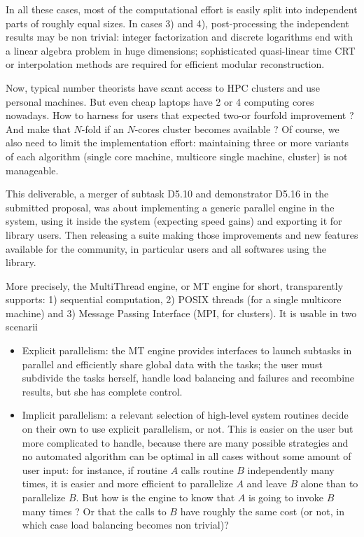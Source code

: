 \documentclass{deliverablereport}
\begin{document}
In all these cases, most of the computational effort is easily split into
independent parts of roughly equal sizes. In cases 3) and 4),
post-processing the independent results may be non trivial: integer
factorization and discrete logarithms end with a linear algebra problem in
huge dimensions; sophisticated quasi-linear time CRT or interpolation methods
are required for efficient modular reconstruction.

Now, typical number theorists have scant access to HPC clusters and use
personal machines. But even cheap laptops have 2 or 4 computing cores
nowadays. How to harness for \PariGP users that expected two-or fourfold
improvement ? And make that $N$-fold if an $N$-cores cluster becomes
available ? Of course, we also need to limit the implementation effort:
maintaining three or more variants of each algorithm (single core machine,
multicore single machine, cluster) is not manageable.

This deliverable, a merger of subtask D5.10 and demonstrator D5.16 in the
submitted proposal, was about implementing a generic parallel engine in the
\PariGP system, using it inside the system (expecting speed gains) and
exporting it for library users. Then releasing a \PariGP suite making those
improvements and new features available for the community, in particular
\Sage users and all softwares using the \Pari library.

More precisely, the MultiThread engine, or MT engine for short, transparently
supports: 1) sequential computation, 2) POSIX threads (for a single multicore
machine) and 3) Message Passing Interface (MPI, for clusters). It is usable
in two scenarii

\begin{itemize}
\item Explicit parallelism: the MT engine provides interfaces to launch
  subtasks in parallel and efficiently share global data with the tasks; the
  user must subdivide the tasks herself, handle load balancing and failures
  and recombine results, but she has complete control.

\item Implicit parallelism: a relevant selection of high-level system
  routines decide on their own to use explicit parallelism, or not. This is
  easier on the user but more complicated to handle, because there are many
  possible strategies and no automated algorithm can be optimal in all
  cases without some amount of user input: for instance, if routine $A$
  calls routine $B$ independently many times, it is easier and more efficient
  to parallelize $A$ and leave $B$ alone than to parallelize $B$. But how is
  the engine to know that $A$ is going to invoke $B$ many times ? Or that the
  calls to $B$ have roughly the same cost (or not, in which case load
  balancing becomes non trivial)?
\end{itemize}
\end{document}
